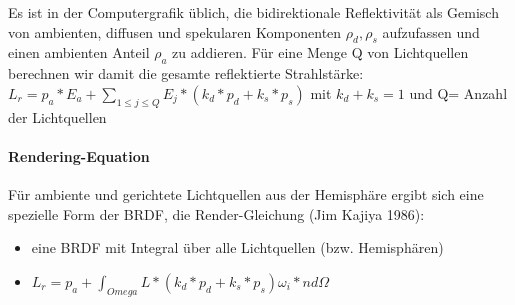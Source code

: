 \documentclass[10pt,landscape]{article}
\begin{document}
\begin{multicols}{3}
{  Es ist in der Computergrafik üblich, die bidirektionale Reflektivität als Gemisch von ambienten, diffusen und spekularen Komponenten $ρ_d, ρ_s$ aufzufassen und
  einen ambienten Anteil $ρ_a$ zu addieren. Für eine Menge Q von Lichtquellen berechnen wir damit die gesamte reflektierte Strahlstärke: $L_r=p_a*E_a+\sum_{1\leq j \leq Q} E_j * (k_d*p_d + k_s*p_s)$ mit $k_d+k_s=1$ und Q= Anzahl der Lichtquellen
  
  \paragraph{Rendering-Equation}
  Für ambiente und gerichtete Lichtquellen aus der Hemisphäre ergibt sich eine spezielle Form der BRDF, die Render-Gleichung (Jim Kajiya 1986):
  \begin{itemize}
    \item eine BRDF mit Integral über alle Lichtquellen (bzw. Hemisphären)
    \item $L_r=p_a + \int_{Omega} L*(k_d*p_d+k_s*p_s) \omega_i*n d\Omega$
  \end{itemize}
  
  
}
\end{multicols}
\end{document}

